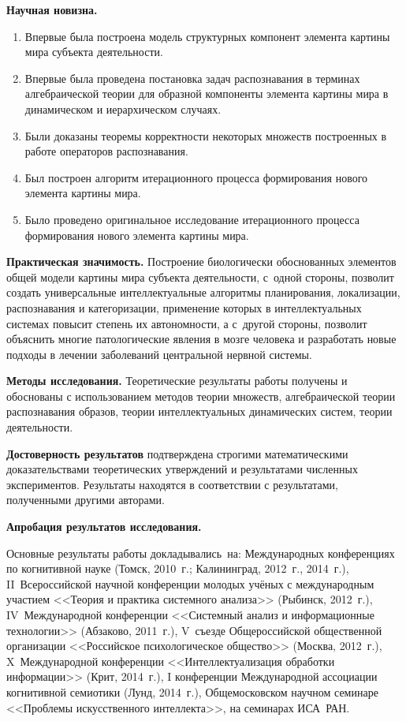 \textbf{Научная новизна.}
\begin{enumerate}
	\renewcommand\labelenumi{\theenumi.}
  \item Впервые была построена модель структурных компонент элемента картины мира субъекта деятельности.
  \item Впервые была проведена постановка задач распознавания в терминах алгебраической теории для образной компоненты элемента картины мира в динамическом и иерархическом случаях.
  \item Были доказаны теоремы корректности некоторых множеств построенных в работе операторов распознавания.
  \item Был построен алгоритм итерационного процесса формирования нового элемента картины мира.
  \item Было проведено оригинальное исследование итерационного процесса формирования нового элемента картины мира.
\end{enumerate}

\textbf{Практическая значимость.} Построение биологически обоснованных элементов общей модели картины мира субъекта деятельности, с~одной стороны, позволит создать универсальные интеллектуальные алгоритмы планирования, локализации, распознавания и категоризации, применение которых в интеллектуальных системах повысит степень их автономности, а с~другой стороны, позволит объяснить многие патологические явления в мозге человека и разработать новые подходы в лечении заболеваний центральной нервной системы.

\textbf{Методы исследования.} Теоретические результаты работы получены и обоснованы с использованием методов теории множеств, алгебраической теории распознавания образов, теории интеллектуальных динамических систем, теории деятельности.

\textbf{Достоверность результатов} подтверждена строгими математическими доказательствами теоретических утверждений и результатами численных экспериментов. Результаты находятся в соответствии с результатами, полученными другими авторами.

\textbf{Апробация результатов исследования.}

Основные результаты работы докладывались~на: Международных конференциях по когнитивной науке (Томск, 2010~г.; Калининград, 2012~г., 2014~г.), II~Всероссийской научной конференции молодых учёных с международным участием <<Теория и практика системного анализа>> (Рыбинск, 2012~г.), IV~Международной конференции <<Системный анализ и информационные технологии>> (Абзаково, 2011~г.), V~съезде Общероссийской общественной организации <<Российское психологическое общество>> (Москва, 2012~г.), X~Международной конференции <<Интеллектуализация обработки информации>> (Крит, 2014~г.), I конференции Международной ассоциации когнитивной семиотики (Лунд, 2014~г.), Общемосковском научном семинаре <<Проблемы искусственного интеллекта>>, на семинарах ИСА~РАН.

